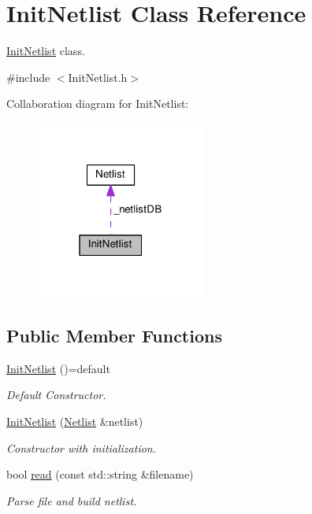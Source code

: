 \hypertarget{classInitNetlist}{}\section{Init\+Netlist Class Reference}
\label{classInitNetlist}


\hyperlink{classInitNetlist}{Init\+Netlist} class.  




{\ttfamily \#include $<$Init\+Netlist.\+h$>$}



Collaboration diagram for Init\+Netlist\+:\nopagebreak
\begin{figure}[H]
\begin{center}
\leavevmode
\includegraphics[width=159pt]{classInitNetlist__coll__graph}
\end{center}
\end{figure}
\subsection*{Public Member Functions}
\begin{DoxyCompactItemize}
\item 
\hyperlink{classInitNetlist_a9def85cc1861a8a74494d9fd494acdeb}{Init\+Netlist} ()=default
\begin{DoxyCompactList}\small\item\em Default Constructor. \end{DoxyCompactList}\item 
\hyperlink{classInitNetlist_a330ee469b31e43357171f5943dad6387}{Init\+Netlist} (\hyperlink{classNetlist}{Netlist} \&netlist)
\begin{DoxyCompactList}\small\item\em Constructor with initialization. \end{DoxyCompactList}\item 
bool \hyperlink{classInitNetlist_a4c173b7e51678aad9937969e2e54f867}{read} (const std\+::string \&filename)
\begin{DoxyCompactList}\small\item\em Parse file and build netlist. \end{DoxyCompactList}\end{DoxyCompactItemize}
